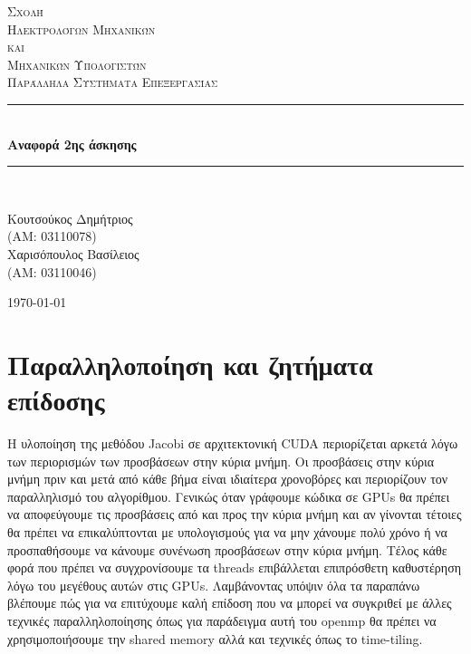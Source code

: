 \documentclass[11pt,a4paper]{article}
\newcommand{\HRule}{\rule{\linewidth}{0.5mm}}
\begin{document}
\begin{titlepage}
\centering


\textsc{\LARGE Σχολή \\ Ηλεκτρολόγων Μηχανικών \\[-3pt] και \\[6pt] Μηχανικών Υπολογιστών}\\[1.5cm]
\textsc{\Large Παράλληλα Συστήματα Επεξεργασίας}\\[0.5cm]

\HRule \\[0.5cm]
{\huge \bfseries Αναφορά 2ης άσκησης}\\[0.2cm]
\HRule \\[1.5cm]

\begin{minipage}{0.4\textwidth}
\large
Κουτσούκος Δημήτριος \\
(ΑΜ: 03110078) \\
Χαρισόπουλος Βασίλειος \\
(ΑΜ: 03110046) \\
\end{minipage}

\vfill

{\large \today}
\end{titlepage}

\clearpage
\clearpage
\newpage
\section{Παραλληλοποίηση και ζητήματα επίδοσης}
Η υλοποίηση της μεθόδου Jacobi σε αρχιτεκτονική CUDA περιορίζεται αρκετά λόγω των περιορισμών των προσβάσεων στην κύρια μνήμη.
Οι προσβάσεις στην κύρια μνήμη πριν και μετά από κάθε βήμα είναι ιδιαίτερα χρονοβόρες και περιορίζουν τον παραλληλισμό του 
αλγορίθμου. Γενικώς όταν γράφουμε κώδικα σε GPUs θα πρέπει να αποφεύγουμε τις προσβάσεις από και προς την κύρια μνήμη και αν
γίνονται τέτοιες θα πρέπει να επικαλύπτονται με υπολογισμούς για να μην χάνουμε πολύ χρόνο ή να προσπαθήσουμε να κάνουμε 
συνένωση προσβάσεων στην κύρια μνήμη. Τέλος κάθε φορά που πρέπει να συγχρονίσουμε τα threads επιβάλλεται επιπρόσθετη καθυστέρηση 
λόγω του μεγέθους αυτών στις GPUs. Λαμβάνοντας υπόψιν όλα τα παραπάνω βλέπουμε πώς για να επιτύχουμε καλή επίδοση 
που να μπορεί να συγκριθεί με άλλες τεχνικές παραλληλοποίησης όπως για παράδειγμα αυτή του openmp θα πρέπει να χρησιμοποιήσουμε
την shared memory αλλά και τεχνικές όπως το time-tiling.
\end{document}
